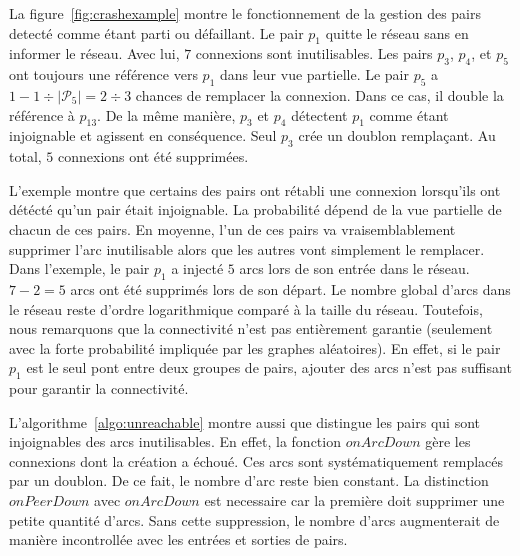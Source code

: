 La figure~\ref{fig:crashexample} montre le fonctionnement de la gestion des
pairs detecté comme étant parti ou défaillant. Le pair $p_1$ quitte le réseau
sans en informer le réseau. Avec lui, $7$ connexions sont inutilisables. Les
pairs $p_3$, $p_4$, et $p_5$ ont toujours une référence vers $p_1$ dans leur vue
partielle. Le pair $p_5$ a $1-{1\div{|\mathcal{P}_5|}}={2\div{3}}$ chances de
remplacer la connexion. Dans ce cas, il double la référence à $p_{13}$. De la
même manière, $p_3$ et $p_4$ détectent $p_1$ comme étant injoignable et agissent
en conséquence. Seul $p_3$ crée un doublon remplaçant. Au total, $5$ connexions
ont été supprimées.

L'exemple montre que certains des pairs ont rétabli une connexion lorsqu'ils ont
détécté qu'un pair était injoignable. La probabilité dépend de la vue partielle
de chacun de ces pairs. En moyenne, l'un de ces pairs va vraisemblablement
supprimer l'arc inutilisable alors que les autres vont simplement le
remplacer. Dans l'exemple, le pair $p_1$ a injecté $5$ arcs lors de son entrée
dans le réseau. $7-2 = 5$ arcs ont été supprimés lors de son départ. Le nombre
global d'arcs dans le réseau reste d'ordre logarithmique comparé à la taille du
réseau. Toutefois, nous remarquons que la connectivité n'est pas entièrement
garantie (seulement avec la forte probabilité impliquée par les graphes
aléatoires). En effet, si le pair $p_1$ est le seul pont entre deux groupes de
pairs, ajouter des arcs n'est pas suffisant pour garantir la connectivité.

L'algorithme~\ref{algo:unreachable} montre aussi que \SPRAY distingue les pairs
qui sont injoignables des arcs inutilisables. En effet, la fonction $onArcDown$
gère les connexions dont la création a échoué. Ces arcs sont systématiquement
remplacés par un doublon. De ce fait, le nombre d'arc reste bien constant. La
distinction $onPeerDown$ avec $onArcDown$ est necessaire car la première doit
supprimer une petite quantité d'arcs. Sans cette suppression, le nombre d'arcs
augmenterait de manière incontrollée avec les entrées et sorties de pairs.

